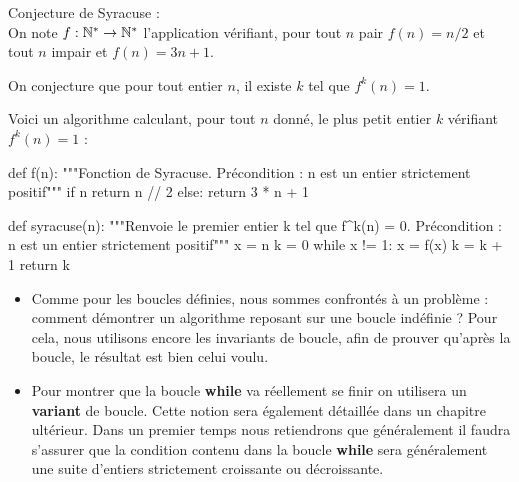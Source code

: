 

\label{ex-syracuse} Conjecture de Syracuse :\\
On note $f : \mathbb{N}^{*} \to \mathbb{N}^{*}$ l'application vérifiant, pour tout $n$ pair
$f(n)=n/2$ et tout $n$ impair et $f(n)=3n+1$.

On conjecture que pour tout entier $n$, il existe $k$ tel que
$f^{k}(n)=1$.

Voici un algorithme calculant, pour tout $n$ donné, le plus petit
entier $k$ vérifiant $f^{k}(n) = 1$ :


\begin{pyverbatim}
def f(n):
    """Fonction de Syracuse.
    Précondition : n est un entier strictement positif"""
    if n %
        return n // 2
    else:
        return 3 * n + 1
        
def syracuse(n):
    """Renvoie le premier entier k tel que  f^k(n) = 0.
    Précondition : n est un entier strictement positif"""
    x = n
    k = 0
    while x != 1:
        x = f(x)
        k = k + 1
    return k
\end{pyverbatim}

\begin{rem}
\begin{itemize}
\item Comme pour les boucles définies, nous sommes confrontés à un problème : comment démontrer un 
algorithme reposant sur une boucle indéfinie ? Pour cela, nous utilisons encore les invariants de 
boucle, afin de prouver qu'après la boucle, le résultat est bien celui voulu.
\item Pour montrer que la boucle \textbf{while} va réellement se finir on utilisera un \textbf{variant} de boucle. Cette notion sera également détaillée dans un chapitre ultérieur. Dans un premier temps nous retiendrons que généralement il faudra s'assurer que la condition contenu dans la boucle \textbf{while} sera généralement une suite d'entiers strictement croissante ou décroissante.
\end{itemize}
\\
\end{rem}

